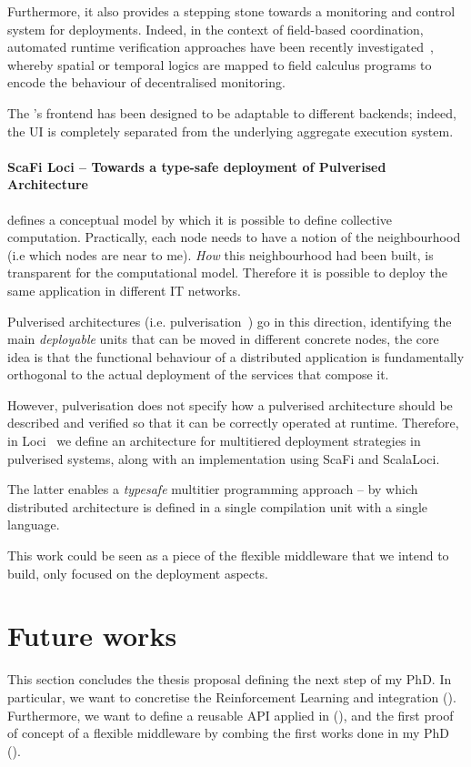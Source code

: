 \documentclass[11pt]{article}
\begin{document}
Furthermore, it also provides a stepping stone towards a monitoring and control system for \ac{} deployments.
Indeed, in the context of field-based coordination, automated runtime verification approaches have been recently investigated~\cite{DBLP:journals/jss/AudritoCDSV21}, whereby spatial or temporal logics are mapped to field calculus programs to encode the behaviour of decentralised monitoring.

The \scafiweb{}'s frontend has been designed to be adaptable to different backends; indeed, the UI is completely separated from the underlying aggregate execution system. 

\paragraph{ScaFi Loci -- Towards a type-safe deployment of Pulverised Architecture}
\ac{} defines a conceptual model by which it is possible to define collective computation. Practically, each node needs to have a notion of the neighbourhood (i.e which nodes are near to me). \textit{How} this neighbourhood had been built, is transparent for the computational model. Therefore it is possible to deploy the same application in different IT networks.

Pulverised architectures (i.e. pulverisation~\cite{DBLP:journals/fi/CasadeiPPVW20}) go in this direction, identifying the main \textit{deployable} units that can be moved in different concrete nodes, the core idea is that the functional behaviour of a distributed application is fundamentally orthogonal to the actual deployment of the services that compose it.

However, pulverisation does not specify how a pulverised architecture should
be described and verified so that it can be correctly operated at runtime.
Therefore, in \scafi{} Loci~\cite{DBLP:conf/acsos/AguzziCPSV21} we define an architecture for multitiered deployment strategies in pulverised systems, along with an implementation using ScaFi and ScalaLoci.

The latter enables a \textit{typesafe} multitier programming approach -- by which distributed architecture is defined
in a single compilation unit with a single language.

This work could be seen as a piece of the flexible middleware that we intend to build, only focused on the deployment aspects.

\section{Future works}\label{future}
This section concludes the thesis proposal defining the next step of my PhD. In particular, we want to concretise the Reinforcement Learning and \acfull{} integration (). Furthermore, we want to define a reusable API applied in \cpsw{} (), and the first proof of concept of a flexible middleware by combing the first works done in my PhD (). 
\end{document}
